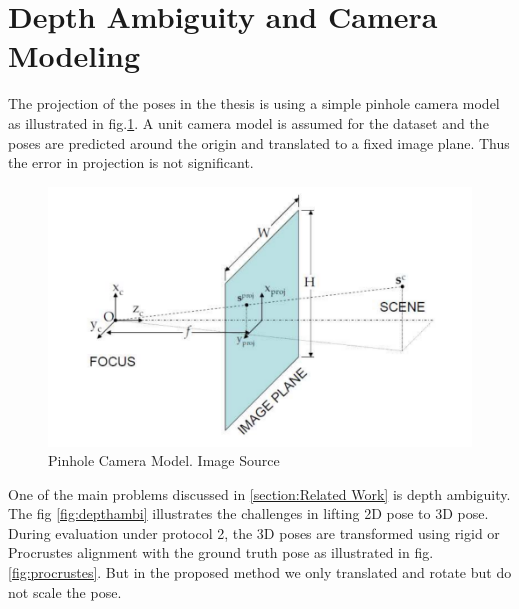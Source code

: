 \section{Depth Ambiguity and Camera Modeling}

The projection of the poses in the thesis is using a simple pinhole camera model as illustrated in fig.\ref{fig:pinhole}. A unit camera model is assumed for the dataset and the poses are predicted around the origin and translated to a fixed image plane. Thus the error in projection is not significant. 

\begin{figure}[!h]
    \centering
    \includegraphics[scale=0.4]{figures/pinhole.png}
    \caption{Pinhole Camera Model. Image Source \cite{pinhole}}
    \label{fig:pinhole}
\end{figure}

One of the main problems discussed in \ref{section:Related Work} is depth ambiguity. The fig \ref{fig:depthambi} illustrates the challenges in lifting 2D pose to 3D pose. During evaluation under protocol 2, the 3D poses are transformed using rigid or Procrustes alignment with the ground truth pose as illustrated in fig. \ref{fig:procrustes}. But in the proposed method we only translated and rotate but do not scale the pose.





